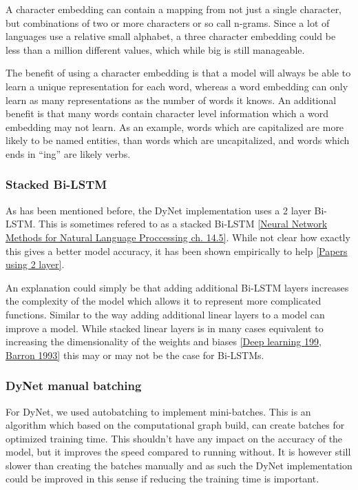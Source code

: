 A character embedding can contain a mapping from not just a single character,
but combinations of two or more characters or so call n-grams. Since a lot of
languages use a relative small alphabet, a three character embedding could be
less than a million different values, which while big is still manageable.

The benefit of using a character embedding is that a model will always be able
to learn a unique representation for each word, whereas a word embedding can
only learn as many representations as the number of words it knows. An
additional benefit is that many words contain character level information which
a word embedding may not learn. As an example, words which are capitalized are
more likely to be named entities, than words which are uncapitalized, and words
which ends in ``ing'' are likely verbs.

\subsubsection{Stacked Bi-LSTM}

As has been mentioned before, the DyNet implementation uses a 2 layer Bi-LSTM.
This is sometimes refered to as a stacked Bi-LSTM \ref{Neural Network Methods
for Natural Language Proccessing ch. 14.5}. While not clear how exactly this
gives a better model accuracy, it has been shown empirically to help
\ref{Papers using 2 layer}.

An explanation could simply be that adding additional Bi-LSTM layers increases
the complexity of the model which allows it to represent more complicated
functions. Similar to the way adding additional linear layers to a model can
improve a model. While stacked linear layers is in many cases equivalent to
increasing the dimensionality of the weights and biases \ref{Deep learning 199,
Barron 1993} this may or may not be the case for Bi-LSTMs.

\subsubsection{DyNet manual batching}

For DyNet, we used autobatching to implement mini-batches. This is an algorithm
which based on the computational graph build, can create batches for optimized
training time. This shouldn't have any impact on the accuracy of the model, but
it improves the speed compared to running without. It is however still slower
than creating the batches manually and as such the DyNet implementation could be
improved in this sense if reducing the training time is important.


